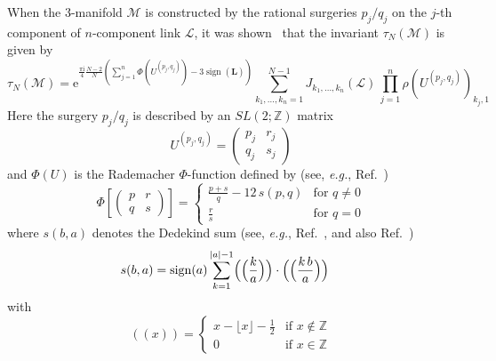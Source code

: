 \documentclass[12pt,reqno]{amsart}
\numberwithin{equation}{section}
\DeclareMathOperator{\sign}{sign}
\begin{document}
When the 3-manifold $\mathcal{M}$ is constructed by the rational
surgeries
$p_j / q_j$
on the $j$-th component of $n$-component link $\mathcal{L}$, it was
shown~\cite{ResheTurae91a,LCJeff92a} that the invariant $\tau_N(\mathcal{M})$ is
given by
\begin{equation}
  \label{define_invariant}
  \tau_N(\mathcal{M})
  =
  \mathrm{e}^{
    \frac{\pi \mathrm{i}}{4} \frac{N-2}{N}
    \left(
      \sum_{j=1}^n \Phi(U^{(p_j,q_j)})
      -3 \sign(\mathbf{L})
    \right)
  }
  \sum_{k_1, \dots, k_n=1}^{N-1}
  J_{k_1,\dots,  k_n}(\mathcal{L}) \,
  \prod_{j=1}^n
  \rho(U^{(p_j,q_j)})_{k_j, 1}
\end{equation}
Here the surgery $p_j/q_j$  is described by an $SL(2; \mathbb{Z})$ matrix
\begin{equation*}
  U^{(p_j,q_j)}=
  \begin{pmatrix}
    p_j & r_j \\
    q_j & s_j
  \end{pmatrix}
\end{equation*}
and $\Phi(U)$ is the Rademacher $\Phi$-function defined by
(see, \emph{e.g.}, Ref.~)
\begin{equation}
  \Phi
  \left[
    \begin{pmatrix}
      p & r \\
      q & s
    \end{pmatrix}
  \right]
  =
  \begin{cases}
    \displaystyle
    \frac{p+s}{q} - 12 \, s(p, q) &
    \text{for $q \neq 0$}
    \\[3mm]
%
    \displaystyle
    \frac{r}{s}
    &
    \text{for $q=0$}
  \end{cases}
\end{equation}
where   $s(b,a)$ denotes the Dedekind sum  
(see, \emph{e.g.},  Ref.~, and
also Ref.~)
\begin{align}
  \label{Dedekind_sum}
  s(b,a)
  & =
  \sign(a)
  \sum_{k=1}^{|a|-1}
  \Bigl(\Bigl( \frac{k}{a} \Bigr) \Bigr) \cdot
  \Bigl(\Bigl( \frac{k \, b}{a} \Bigr) \Bigr) 
\end{align}
with
\begin{equation*}
  ((x))
  =
  \begin{cases}
    x - \lfloor x \rfloor - \frac{1}{2}
    &
    \text{if $x \not\in \mathbb{Z}$}
    \\[3mm]
    0
    &
    \text{if $x \in \mathbb{Z}$}
  \end{cases}
\end{equation*}
\end{document}

